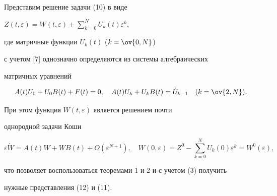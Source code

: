 \begin{pf} 


Представим решение задачи (10) в виде 


$Z(t,\varepsilon)=W(t,\varepsilon)+\sum\limits^N_{k=0} U_k(t)\varepsilon^k$, 


где матричные функции $U_k(t)$ ($k=\ov{0,N}$) 


с учетом [7] однозначно определяются из системы алгебраических 


матричных уравнений 


$$ 


A(t)U_0+U_0B(t)+F(t)=0,\quad 


A(t)U_k+U_k B(t)=\Dot U_{k-1}\quad (k=\ov{2,N}). 


$$ 


При этом функция $W(t,\varepsilon)$ является решением почти 


однородной задачи Коши 


$$ 


\varepsilon\Dot W=A(t)W+WB(t)+O(\varepsilon^{N+1}),\quad 


W(0,\varepsilon)=Z^0-\sum^N_{k=0} U_k(0)\varepsilon^k= 


W^0(\varepsilon), 


$$ 


что позволяет воспользоваться теоремами 1 и 2 и с учетом (3) получить 


нужные представления (12) и (11).


\end{pf}


 


 


